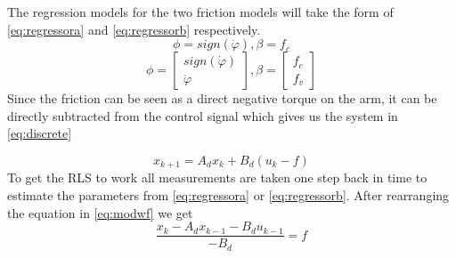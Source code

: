 \documentclass[10pt,a4paper]{article}
\begin{document}
The regression models for the two friction models will take the form of \ref{eq:regressora} and \ref{eq:regressorb} respectively.
\begin{equation}
\phi=sign(\dot{\varphi}), \beta = f_c
\label{eq:regressora}
\end{equation}
\begin{equation}
\phi=\begin{bmatrix}
sign(\dot{\varphi}) \\
\dot{\varphi}
\end{bmatrix}, \beta = \begin{bmatrix}
f_c\\
f_v
\end{bmatrix}
\label{eq:regressorb}
\end{equation}
Since the friction can be seen as a direct negative torque on the arm, it can be directly subtracted from the control signal which gives us the system in \ref{eq:discrete}

\begin{equation}
 x_{k+1} = A_dx_k + B_d(u_k - f)
\label{eq:modwf}
\end{equation}
To get the RLS to work all measurements are taken one step back in time to estimate the parameters from \ref{eq:regressora} or \ref{eq:regressorb}. After rearranging the equation in \ref{eq:modwf} we get
\begin{equation}
 \dfrac{x_{k}-A_dx_{k-1}-B_d u_{k-1}}{-B_d} =   f
\label{eq:estim}
\end{equation}
\end{document}
